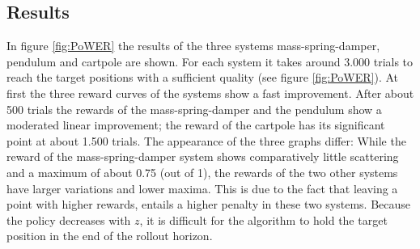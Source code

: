 \documentclass[letterpaper, 10 pt, conference]{ieeeconf}  %
\begin{document}

%

\subsection{Results}
In figure \ref{fig:PoWER} 
the results of the three systems mass-spring-damper, pendulum and cartpole are shown. For each system it takes around 3.000 trials to reach the target positions with a sufficient quality (see figure \ref{fig:PoWER}). At first the three reward curves of the systems show a fast improvement. After about 500 trials the rewards of the mass-spring-damper and the pendulum show a moderated linear improvement; the reward of the cartpole has its significant point at about 1.500 trials. The appearance of the three graphs differ: While the reward of the mass-spring-damper system shows comparatively little scattering and a maximum of about 0.75 (out of 1), the rewards of the two other systems have larger variations and lower maxima. This is due to the fact that leaving a point with higher rewards, entails a higher penalty in these two systems. Because the policy decreases with $z$, it is difficult for the algorithm to hold the target position in the end of the rollout horizon.
\end{document}
